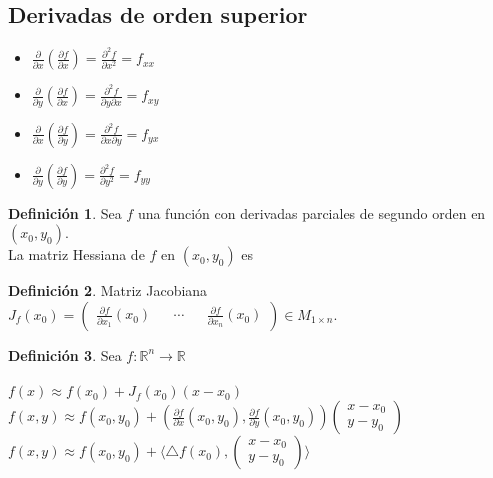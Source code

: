 \documentclass[10pt]{article}
\theoremstyle{definition}
\newtheorem{definition}{Definición}[section]
\begin{document}
\subsection{Derivadas de orden superior}
\begin{itemize}
    \item $\frac{\partial}{\partial x}(\frac{\partial f}{\partial x})=\frac{\partial^2 f}{\partial x^2}=f_{xx}$
    \item $\frac{\partial}{\partial y}(\frac{\partial f}{\partial x})=\frac{\partial^2 f}{\partial y\partial x}=f_{xy}$
    \item $\frac{\partial}{\partial x}(\frac{\partial f}{\partial y})=\frac{\partial^2 f}{\partial x\partial y}=f_{yx}$
    \item $\frac{\partial}{\partial y}(\frac{\partial f}{\partial y})=\frac{\partial^2 f}{\partial y^2}=f_{yy}$
\end{itemize}
\begin{definition}
    Sea $f$ una función con derivadas parciales de segundo orden en $(x_0,y_0)$.
    \\La matriz Hessiana de $f$ en $(x_0,y_0)$ es 
\end{definition}
\begin{definition}{Matriz Jacobiana}
    \\$J_f(x_0)=\begin{pmatrix} \frac{\partial f}{\partial x_1} (x_0) && \cdots && \frac{\partial f}{\partial x_n}(x_0) \end{pmatrix}\in M_{1\times n} $.
\end{definition}
\begin{definition}
    Sea $f:\mathbb{R}^n\to\mathbb{R}$\\
    \\$f(x)\approx f(x_0)+J_f(x_0)(x-x_0)$
    \\$f(x,y)\approx f(x_0,y_0)+(\frac{\partial f}{\partial x}(x_0,y_0), \frac{\partial f}{\partial y}(x_0,y_0)) \begin{pmatrix} x-x_0 \\ y-y_0 \end{pmatrix} $
    \\$f(x,y)\approx f(x_0,y_0)+\langle\triangle f(x_0),\begin{pmatrix} x-x_0 \\ y-y_0 \end{pmatrix} \rangle$
\end{definition}
\end{document}
